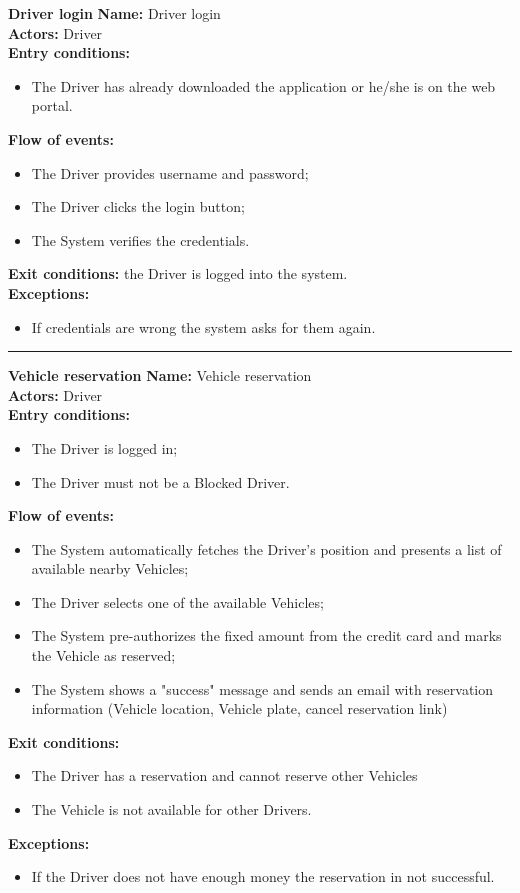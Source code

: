 \textbf{\large Driver login}
\bigbreak
\textbf{Name:} Driver login \\
\textbf{Actors:} Driver \\
\textbf{Entry conditions:} 
\begin{itemize}
\item The Driver has already downloaded the application or he/she is on the web portal.
\end{itemize}
\textbf{Flow of events:} 
\begin{itemize}
\item The Driver provides username and password;
\item The Driver clicks the login button;
\item The System verifies the credentials.
\end{itemize}
\textbf{Exit conditions:} the Driver is logged into the system.\\
\textbf{Exceptions:} 
\begin{itemize}
\item If credentials are wrong the system asks for them again.
\end{itemize}


\begin{center}
\noindent\rule{8cm}{1.0pt}
\end{center}


\textbf{\large Vehicle reservation}
\bigbreak
\textbf{Name:} Vehicle reservation \\
\textbf{Actors:} Driver \\
\textbf{Entry conditions:} 
\begin{itemize}
\item The Driver is logged in;
\item The Driver must not be a Blocked Driver.
\end{itemize}
\textbf{Flow of events:} 
\begin{itemize}
\item The System automatically fetches the Driver's position and presents a list of available nearby Vehicles;
\item The Driver selects one of the available Vehicles;
\item The System pre-authorizes the fixed amount from the credit card and marks the Vehicle as reserved;
\item The System shows a "success" message and sends an email with reservation information (Vehicle location, Vehicle plate, cancel reservation link)
\end{itemize}
\textbf{Exit conditions:} 
\begin{itemize}
\item The Driver has a reservation and cannot reserve other Vehicles 
\item The Vehicle is not available for other Drivers.\\
\end{itemize}
\textbf{Exceptions:} 
\begin{itemize}
\item If the Driver does not have enough money the reservation in not successful.
\end{itemize}


